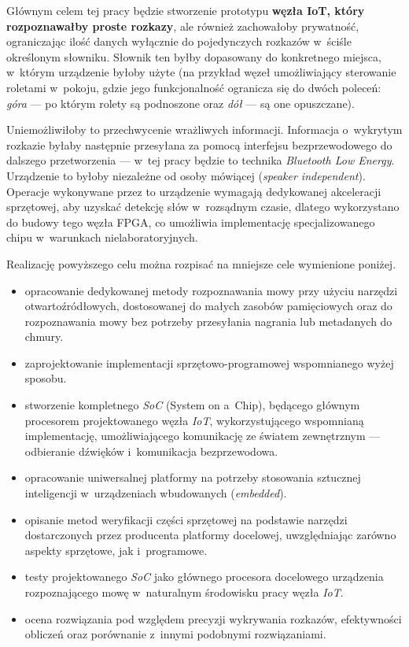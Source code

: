 Głównym celem tej pracy będzie stworzenie prototypu \textbf{węzła IoT, który rozpoznawałby proste rozkazy}, ale również zachowałoby prywatność, ograniczając ilość danych wyłącznie do pojedynczych rozkazów w~ściśle określonym słowniku. Słownik ten byłby dopasowany do konkretnego miejsca, w~którym urządzenie byłoby użyte (na przykład węzeł umożliwiający sterowanie roletami w~pokoju, gdzie jego funkcjonalność ogranicza się do dwóch poleceń: \textit{góra} — po którym rolety są podnoszone oraz \textit{dół} — są one opuszczane).

Uniemożliwiłoby to przechwycenie wrażliwych informacji. Informacja o~wykrytym rozkazie byłaby następnie przesyłana za pomocą interfejsu bezprzewodowego do dalszego przetworzenia — w~tej pracy będzie to technika \textit{Bluetooth Low Energy}. Urządzenie to byłoby niezależne od osoby mówiącej (\textit{speaker independent}). Operacje wykonywane przez to urządzenie wymagają dedykowanej akceleracji sprzętowej, aby uzyskać detekcję słów w~rozsądnym czasie, dlatego wykorzystano do budowy tego węzła FPGA, co umożliwia implementację specjalizowanego chipu w~warunkach nielaboratoryjnych.

Realizację powyższego celu można rozpisać na mniejsze cele wymienione poniżej.
\begin{itemize}
	\item opracowanie dedykowanej metody rozpoznawania mowy przy użyciu narzędzi otwartoźródłowych, dostosowanej do małych zasobów pamięciowych oraz do rozpoznawania mowy bez potrzeby przesyłania nagrania lub metadanych do chmury.
	\item zaprojektowanie implementacji sprzętowo-programowej wspomnianego wyżej sposobu.
	\item stworzenie kompletnego \textit{SoC} (System on a~Chip), będącego głównym procesorem projektowanego węzła \textit{IoT}, wykorzystującego wspomnianą implementację, umożliwiającego komunikację ze światem zewnętrznym — odbieranie dźwięków i~komunikacja bezprzewodowa.
	\item opracowanie uniwersalnej platformy na potrzeby stosowania sztucznej inteligencji w~urządzeniach wbudowanych (\textit{embedded}).
	\item opisanie metod weryfikacji części sprzętowej na podstawie narzędzi dostarczonych przez producenta platformy docelowej, uwzględniając zarówno aspekty sprzętowe, jak i~programowe.
	\item testy projektowanego \textit{SoC} jako głównego procesora docelowego urządzenia rozpoznającego mowę w~naturalnym środowisku pracy węzła \textit{IoT}.
	\item ocena rozwiązania pod względem precyzji wykrywania rozkazów, efektywności obliczeń oraz porównanie z~innymi podobnymi rozwiązaniami.
\end{itemize}


